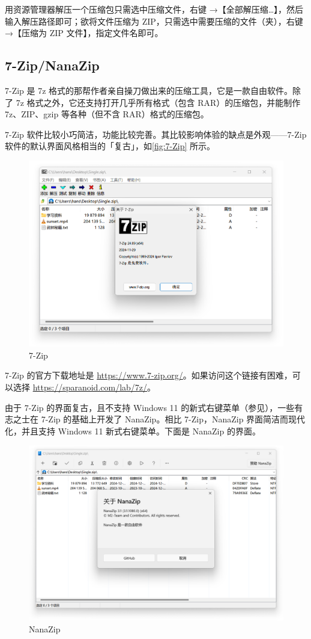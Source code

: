 {用资源管理器解压一个压缩包只需选中压缩文件，右键 →【全部解压缩…】，然后输入解压路径即可；欲将文件压缩为 ZIP，只需选中需要压缩的文件（夹），右键 →【压缩为 ZIP 文件】，指定文件名即可。

\subsection{7-Zip/NanaZip}

7-Zip 是 7z 格式的那帮作者亲自操刀做出来的压缩工具，它是一款自由软件。除了 7z 格式之外，它还支持打开几乎所有格式（包含 RAR）的压缩包，并能制作 7z、ZIP、gzip 等各种（但不含 RAR）格式的压缩包。

7-Zip 软件比较小巧简洁，功能比较完善。其比较影响体验的缺点是外观——7-Zip 软件的默认界面风格相当的「复古」，如\autoref{fig:7-Zip} 所示。

\begin{figure}[htb!]
  \centering
  \includegraphics[width=.65\textwidth]{assets/software/7-Zip.png}
  \caption{7-Zip}
  \label{fig:7-Zip}
\end{figure}

7-Zip 的官方下载地址是 \url{https://www.7-zip.org/}。如果访问这个链接有困难，可以选择 \url{https://sparanoid.com/lab/7z/}。

由于 7-Zip 的界面复古，且不支持 Windows 11 的新式右键菜单（参见），一些有志之士在 7-Zip 的基础上开发了 NanaZip。相比 7-Zip，NanaZip 界面简洁而现代化，并且支持 Windows 11 新式右键菜单。下面是 NanaZip 的界面。

\begin{figure}[htb!]
  \centering
  \includegraphics[width=.65\textwidth]{assets/software/NanaZip.png}
  \caption{NanaZip}
  \label{fig:NanaZip}
\end{figure}

}
